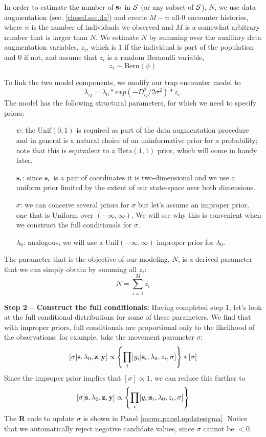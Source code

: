In order to estimate the number of ${\bf s}_i$ in ${\cal S}$ (or any
subset of ${\cal S}$), $N$, we use data augmentation (sec. \ref{closed.sec.da}) and create $M-n$ all-0 encounter histories, where $n$ is the number of individuals we observed and $M$ is a somewhat arbitrary number that is larger than $N$. We estimate $N$ by summing over the auxiliary data augmentation variables, $z_i$, which is 1 if the individual is part of the population and 0 if not, and assume that $z_i$ is a random Bernoulli variable,
\[
z_{i} \sim \mbox{Bern}(\psi)
\]

To link the two model components, we modify our trap encounter model to
\[
\lambda_{ij} = \lambda_0 * exp(-D_{ij}^2/2\sigma^2) * z_{i}.
\]
The model has the following structural parameters, for which we need to specify priors:
\begin{itemize}
\item[ $\psi$:] the $\mbox{Unif}(0,1)$ is required as part of the data augmentation procedure and in general is a natural choice of an uninformative prior for a probability; note that this is equivalent to a $\mbox{Beta}(1,1)$ prior, which will come in handy later.
\item[ ${\bf s}_{i}$:] since ${\bf s}_{i}$ is a pair of coordinates it is two-dimensional and we use a uniform prior limited by the extent of our state-space over both dimensions.
\item[ $\sigma$:] we can conceive several priors for $\sigma$ but let's assume an improper prior, one that is Uniform over $(-\infty, \infty)$. We will see why this is convenient when we construct the full conditionals for $\sigma$.
\item[ $\lambda_{0}$:] analogous, we will use a $\mbox{Unif}(-\infty, \infty)$ improper prior for $\lambda_{0}$.
\end{itemize}
The parameter that is the objective of our modeling, $N$, is a derived parameter that we can simply obtain by summing all $z_i$:
\[
N = \sum_{i=1}^{M} z_{i}
\]

{\bf Step 2 -- Construct the full conditionals:}
Having completed step 1, let's look at the full conditional distributions for some of these parameters.
We find that with improper priors, full conditionals are proportional only to the likelihood of the observations; for example, take the movement parameter $\sigma$:
\[
[\sigma|{\bf s}, \lambda_{0}, {\bf z}, {\bf y}] \propto \left\{ \prod_{i} [y_{i}| {\bf
    s}_{i}, \lambda_{0}, z_{i}, \sigma] \right\} * [\sigma]
\]
Since the improper prior implies that $[\sigma] \propto 1$, we can reduce this further to
\[
[\sigma|{\bf s}, \lambda_{0}, {\bf z}, {\bf y}] \propto \left\{
  \prod_{i} [y_{i}| {\bf s}_{i}, \lambda_{0}, z_{i}, \sigma] \right\}
\]
The {\bf R} code to update $\sigma$ is shown in Panel
\ref{mcmc.panel.updatesigma}.
 Notice that we automatically reject negative candidate values, since $\sigma$ cannot be $<0$.  

